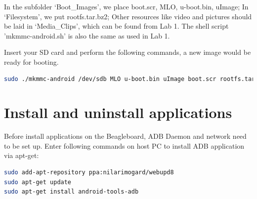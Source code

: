 \documentclass[12pt,journal,draftclsnofoot,onecolumn]{IEEEtran}
\begin{document}
In the subfolder `Boot\_Images', we place boot.scr, MLO, u-boot.bin, uImage; In `Filesystem', we put  rootfs.tar.bz2; Other resources like video and pictures should be laid in `Media\_Clips', which can be found from Lab 1. The shell script 'mkmmc-android.sh' is also the same as used in Lab 1.

Insert your SD card and perform the following commands, a new image would be ready for booting. 
 \begin{lstlisting}[language={bash}]
sudo ./mkmmc-android /dev/sdb MLO u-boot.bin uImage boot.scr rootfs.tar.bz2
\end{lstlisting}

\section{Install and uninstall applications}\label{HdDes}
Before install applications on the Beagleboard, ADB Daemon and network need to be set up.
Enter following commands on host PC to install ADB application via apt-get:
\begin{lstlisting}[language={bash}]
sudo add-apt-repository ppa:nilarimogard/webupd8
sudo apt-get update
sudo apt-get install android-tools-adb
\end{lstlisting}
\end{document}
